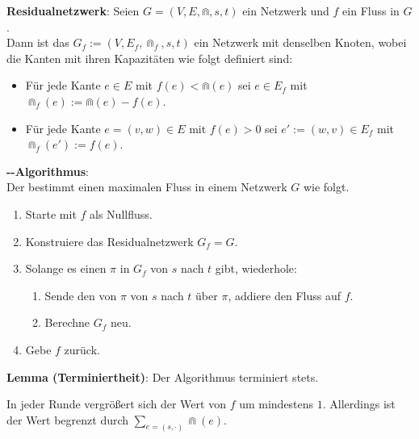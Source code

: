 \textbf{Residualnetzwerk}:
Seien $G = (V, E, \Cap, s, t)$ ein Netzwerk und $f$ ein Fluss in $G$.\\
Dann ist das  $G_f := (V, E_f, \Cap_f, s, t)$ ein Netzwerk
mit denselben Knoten, wobei die Kanten mit ihren Kapazitäten wie folgt definiert sind:
\begin{itemize}
    \item
    Für jede Kante $e \in E$ mit $f(e) < \Cap(e)$ sei
    $e \in E_f$ mit $\Cap_f(e) := \Cap(e) - f(e)$.
    
    \item
    Für jede Kante $e = (v, w) \in E$ mit $f(e) > 0$ sei
    $e' := (w, v) \in E_f$ mit $\Cap_f(e') := f(e)$.
\end{itemize}

\linie

\textbf{--Algorithmus}:\\
Der  bestimmt einen maximalen Fluss in einem Netzwerk
$G$ wie folgt.
\begin{enumerate}
    \item
    Starte mit $f$ als Nullfluss.
    
    \item
    Konstruiere das Residualnetzwerk $G_f = G$.
    
    \item
    Solange es einen  $\pi$ in $G_f$ von $s$ nach $t$ gibt,
    wiederhole:
    \begin{enumerate}
        \item
        Sende den  von $\pi$ von $s$ nach $t$ über $\pi$,
        addiere den Fluss auf $f$.
        
        \item
        Berechne $G_f$ neu.
    \end{enumerate}
    
    \item
    Gebe $f$ zurück.
\end{enumerate}

\textbf{Lemma (Terminiertheit)}:
Der Algorithmus terminiert stets.

\begin{Beweis}
    In jeder Runde vergrößert sich der Wert von $f$ um mindestens $1$.
    Allerdings ist der Wert begrenzt durch $\sum_{e = (s, \cdot)} \Cap(e)$.
\end{Beweis}

